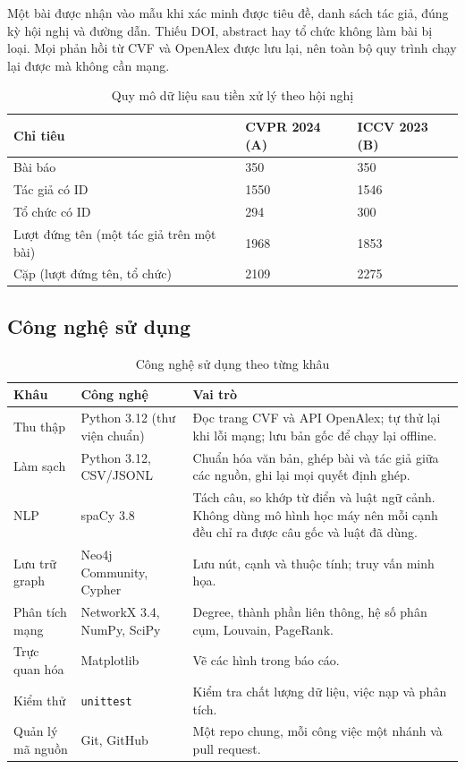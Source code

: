 \documentclass[11pt,a4paper]{article}
\begin{document}
Một bài được nhận vào mẫu khi xác minh được tiêu đề, danh sách tác giả, đúng kỳ hội nghị và đường dẫn. Thiếu DOI, abstract hay tổ chức không làm bài bị loại. Mọi phản hồi từ CVF và OpenAlex được lưu lại, nên toàn bộ quy trình chạy lại được mà không cần mạng.

\begin{table}[H]
\small\centering
\renewcommand{\arraystretch}{1.2}
\caption{Quy mô dữ liệu sau tiền xử lý theo hội nghị}
\label{tab:a1}
\begin{tabularx}{\textwidth}{@{}>{\raggedright\arraybackslash}X l l@{}}
\toprule
\textbf{Chỉ tiêu} & \textbf{CVPR 2024 (A)} & \textbf{ICCV 2023 (B)}\\
\midrule
Bài báo & 350 & 350\\
Tác giả có ID & 1550 & 1546\\
Tổ chức có ID & 294 & 300\\
Lượt đứng tên (một tác giả trên một bài) & 1968 & 1853\\
Cặp (lượt đứng tên, tổ chức) & 2109 & 2275\\
\bottomrule
\end{tabularx}
\end{table}

\subsection{Công nghệ sử dụng}\label{sec:stack}
\begin{table}[H]
\small\centering
\renewcommand{\arraystretch}{1.25}
\caption{Công nghệ sử dụng theo từng khâu}
\label{tab:stack}
\begin{tabularx}{\textwidth}{@{}>{\raggedright\arraybackslash}p{2.8cm} >{\raggedright\arraybackslash}p{4.4cm} >{\raggedright\arraybackslash}X@{}}
\toprule
\textbf{Khâu} & \textbf{Công nghệ} & \textbf{Vai trò}\\
\midrule
Thu thập & Python 3.12 (thư viện chuẩn) & Đọc trang CVF và API OpenAlex; tự thử lại khi lỗi mạng; lưu bản gốc để chạy lại offline.\\
Làm sạch & Python 3.12, CSV/JSONL & Chuẩn hóa văn bản, ghép bài và tác giả giữa các nguồn, ghi lại mọi quyết định ghép.\\
NLP & spaCy 3.8 & Tách câu, so khớp từ điển và luật ngữ cảnh. Không dùng mô hình học máy nên mỗi cạnh đều chỉ ra được câu gốc và luật đã dùng.\\
Lưu trữ graph & Neo4j Community, Cypher & Lưu nút, cạnh và thuộc tính; truy vấn minh họa.\\
Phân tích mạng & NetworkX 3.4, NumPy, SciPy & Degree, thành phần liên thông, hệ số phân cụm, Louvain, PageRank.\\
Trực quan hóa & Matplotlib & Vẽ các hình trong báo cáo.\\
Kiểm thử & \texttt{unittest} & Kiểm tra chất lượng dữ liệu, việc nạp và phân tích.\\
Quản lý mã nguồn & Git, GitHub & Một repo chung, mỗi công việc một nhánh và pull request.\\
\bottomrule
\end{tabularx}
\end{table}
\end{document}
